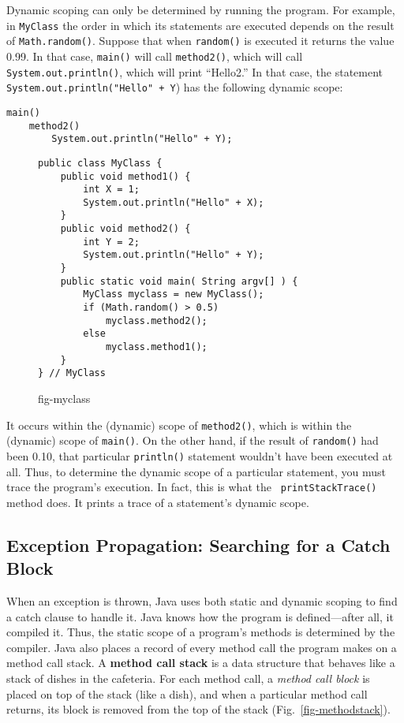 Dynamic scoping can only be determined by running the program.  For
example, in \mbox{\tt MyClass} the order in which its statements are
executed depends on the result of {\tt Math.random()}.  Suppose that
when {\tt random()} is executed it returns the value 0.99. In that
case, {\tt main()} will call {\tt method2()}, which will call {\tt
System.out.println()}, which will print ``Hello2.''  In that case, the
statement {\tt System.out.println("Hello" + Y}) has the following
dynamic scope:

\begin{jjjlisting}
\begin{lstlisting}
main()
    method2()
        System.out.println("Hello" + Y);
\end{lstlisting}
\end{jjjlisting}

\begin{figure}[tb]
\jjjprogstart
\begin{jjjlisting}
\begin{lstlisting}
public class MyClass {
    public void method1() {
        int X = 1;
        System.out.println("Hello" + X);
    }
    public void method2() {
        int Y = 2;
        System.out.println("Hello" + Y);
    }
    public static void main( String argv[] ) {
        MyClass myclass = new MyClass();
        if (Math.random() > 0.5)
            myclass.method2();
        else
            myclass.method1();
    }
} // MyClass
\end{lstlisting}
\end{jjjlisting}
{fig-myclass}
\end{figure}

\noindent It occurs within the (dynamic) scope of {\tt method2()},
which is within the (dynamic) scope of {\tt main()}. On the other
hand, if the result of {\tt random()} had been 0.10, that particular
{\tt println()} statement wouldn't have been executed at all.  Thus, to
determine the dynamic scope of a particular statement, you must trace
the program's execution.  In fact, this is what the {\tt
printStackTrace()} method does.  It prints a trace of a statement's
dynamic scope.

\subsection{Exception Propagation: Searching for a Catch Block}
\noindent When an exception is thrown, Java uses both static and dynamic scoping
to find a catch clause to handle it.  Java knows how the program is
defined---after all, it compiled it.  Thus, the static scope of a
program's methods is determined by the compiler.  Java also places a
record of every method call the program makes on a method call stack.
A {\bf method call stack} is a
 data structure that behaves like a
stack of dishes in the cafeteria.  For each method call, a {\it method
call block} is placed on top of the stack (like a dish), and when a
particular method call returns, its block is removed from the top of
the stack (Fig.~\ref{fig-methodstack}).

